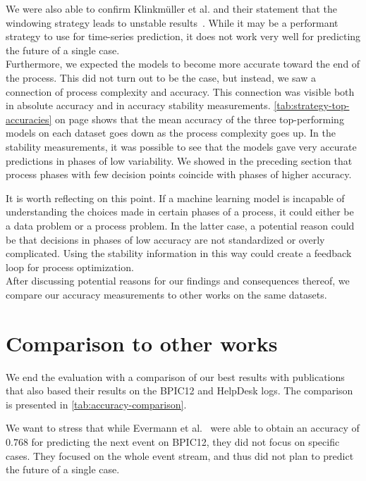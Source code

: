 We were also able to confirm Klinkmüller et al. and their statement that the windowing strategy leads to unstable results~\cite{klinkmuller2018reliablemonitoring}.
While it may be a performant strategy to use for time-series prediction, it does not work very well for predicting the future of a single case.\\

Furthermore, we expected the models to become more accurate toward the end of the process.
This did not turn out to be the case, but instead, we saw a connection of process complexity and accuracy.
This connection was visible both in absolute accuracy and in accuracy stability measurements.
\autoref{tab:strategy-top-accuracies} on page \pageref{tab:strategy-top-accuracies} shows that the mean accuracy of the three top-performing models on each dataset goes down as the process complexity goes up.
In the stability measurements, it was possible to see that the models gave very accurate predictions in phases of low variability.
We showed in the preceding section that process phases with few decision points coincide with phases of higher accuracy.

It is worth reflecting on this point.
If a machine learning model is incapable of understanding the choices made in certain phases of a process, it could either be a data problem or a process problem.
In the latter case, a potential reason could be that decisions in phases of low accuracy are not standardized or overly complicated.
Using the stability information in this way could create a feedback loop for process optimization.\\

After discussing potential reasons for our findings and consequences thereof, we compare our accuracy measurements to other works on the same datasets.

\section{Comparison to other works}
We end the evaluation with a comparison of our best results with publications that also based their results on the BPIC12 and HelpDesk logs.
The comparison is presented in \autoref{tab:accuracy-comparison}.

We want to stress that while Evermann et al.~\cite{evermann2016} were able to obtain an accuracy of $0.768$ for predicting the next event on BPIC12, they did not focus on specific cases.
They focused on the whole event stream, and thus did not plan to predict the future of a single case.


